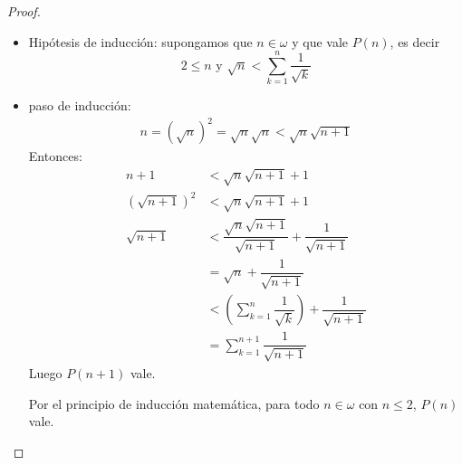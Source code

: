 \begin{ejercicio}
\begin{proof}
\begin{itemize}
        \item Hipótesis de inducción: supongamos que $n \in \omega$ y que vale $P(n)$, es decir
        \begin{equation*}
            2\leq n \text{\ y \ } \sqrt{n} < \sum_{k=1}^n \dfrac{1}{\sqrt{k}}
        \end{equation*}
        \item paso de inducción:
        \begin{align*}
            n = (\sqrt{n})^2 = \sqrt{n}\sqrt{n} < \sqrt{n}\sqrt{n+1}
        \end{align*}
        Entonces:
        \begin{align*}
            n+1 &< \sqrt{n}\sqrt{n+1} +1\\
            (\sqrt{n+1})^2 &< \sqrt{n}\sqrt{n+1}+1\\
            \sqrt{n+1} &< \dfrac{\sqrt{n}\sqrt{n+1}}{\sqrt{n+1}}+\dfrac{1}{\sqrt{n+1}}\\
                           &=\sqrt{n}+\dfrac{1}{\sqrt{n+1}}\\
                           &<\left( \sum_{k=1}^n \dfrac{1}{\sqrt{k}}\right)+\dfrac{1}{\sqrt{n+1}}\\
                           &=\sum_{k=1}^{n+1} \dfrac{1}{\sqrt{n+1}}
        \end{align*}
        Luego $P(n+1)$ vale.

        Por el principio de inducción matemática, para todo $n \in \omega$ con $n \leq 2$, $P(n)$ vale.
        

    \end{itemize}
    
\end{proof}
\end{ejercicio}
